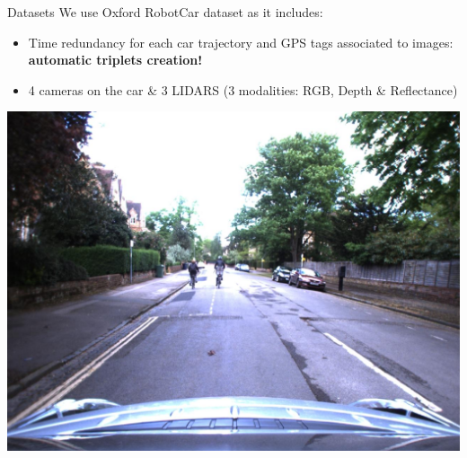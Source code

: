 \begin{frame}{Datasets}	
	We use Oxford RobotCar dataset \cite{Maddern2016} as it includes:
	\begin{itemize}
		\item Time redundancy for each car trajectory and GPS tags associated to images: \textbf{automatic triplets creation!}
		\item 4 cameras on the car \& 3 LIDARS (3 modalities: RGB, Depth \& Reflectance)
	\end{itemize}
	\vfill
	\begin{minipage}[c]{0.22\linewidth}
		\includegraphics[width=\linewidth]{images/robotcar_1.jpg}
		

\end{minipage}
\end{frame}
